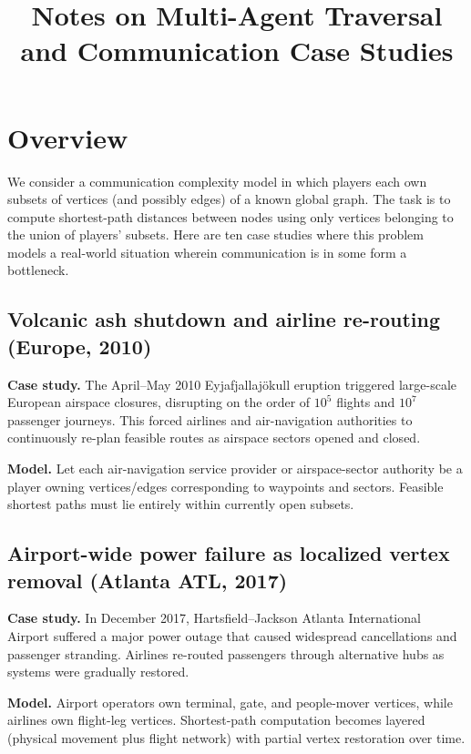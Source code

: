 \documentclass[11pt]{article}
\title{Notes on Multi-Agent Traversal and Communication Case Studies}
\author{}
\date{}
\begin{document}
\maketitle

\section{Overview}
We consider a communication complexity model in which players each own subsets of vertices (and possibly edges) of a known global graph. The task is to compute shortest-path distances between nodes using only vertices belonging to the union of players' subsets. Here are ten case studies where this problem models a real-world situation wherein communication is in some form a bottleneck.

\subsection{Volcanic ash shutdown and airline re-routing (Europe, 2010)}

\textbf{Case study.} The April--May 2010 Eyjafjallaj\"okull eruption triggered large-scale European airspace closures, disrupting on the order of $10^5$ flights and $10^7$ passenger journeys. This forced airlines and air-navigation authorities to continuously re-plan feasible routes as airspace sectors opened and closed. \cite{eurocontrol2010ash}

\textbf{Model.} Let each air-navigation service provider or airspace-sector authority be a player owning vertices/edges corresponding to waypoints and sectors. Feasible shortest paths must lie entirely within currently open subsets.

\subsection{Airport-wide power failure as localized vertex removal (Atlanta ATL, 2017)}
\textbf{Case study.} In December 2017, Hartsfield--Jackson Atlanta International Airport suffered a major power outage that caused widespread cancellations and passenger stranding. Airlines re-routed passengers through alternative hubs as systems were gradually restored. \cite{cntraveler2017atl}

\textbf{Model.} Airport operators own terminal, gate, and people-mover vertices, while airlines own flight-leg vertices. Shortest-path computation becomes layered (physical movement plus flight network) with partial vertex restoration over time.
\end{document}
